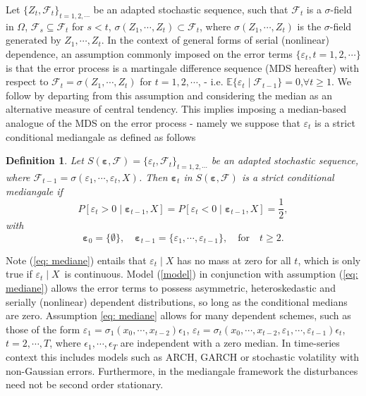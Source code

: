 \documentclass[harvard,11pt]{article}
\newcommand{\E}{\mathbb{E}}
\newtheorem{definition}{Definition}
\begin{document}
 Let $\{Z_t,\mathcal{F}_t\}_{t=1,2,\cdots}$ be an adapted stochastic sequence, such that $\mathcal{F}_t$ is a $\sigma$-field in $\Omega$, $\mathcal{F}_s\subseteq \mathcal{F}_t$ for $s< t$, $\sigma( Z_1,\cdots,Z_t)\subset \mathcal{F}_t$, where $\sigma(Z_1,\cdots,Z_t)$ is the $\sigma$-field generated by $Z_1,\cdots,Z_t$. In the context of general forms of serial (nonlinear) dependence, an assumption commonly imposed on the error terms $\{\varepsilon_t,t=1,2,\cdots\}$ is that the error process is a martingale difference sequence (MDS hereafter) with respect to $\mathcal{F}_t=\sigma(Z_1,\cdots,Z_t)$ for $t=1,2,\cdots$, - i.e. $\E\{\varepsilon_t\mid \mathcal{F}_{t-1}\}=0$,\quad $\forall t\geq1$. We follow \citet{coudin2009finite} by departing from this assumption and considering the median as an alternative measure of central tendency. This implies imposing a median-based analogue of the MDS on the error process - namely we suppose that $\varepsilon_t$ is a strict conditional mediangale as defined as follows
\begin{definition}
Let $S(\bm{\varepsilon},\mathcal{F})=\{\varepsilon_t,\mathcal{F}_{t}\}_{t=1,2,\cdots}$ be an adapted stochastic sequence, where $\mathcal{F}_{t-1}=\sigma(\varepsilon_1,\cdots,\varepsilon_t,X)$. Then $\bm{\varepsilon}_t$ in $S(\bm{\varepsilon},\mathcal{F})$ is a strict conditional mediangale if
\begin{equation}
P[\varepsilon_{t}> 0\mid \bm{{\varepsilon}}_{t-1},X]=P[\varepsilon_{t}<0\mid \bm{\varepsilon}_{t-1},X]=\frac{1}{2},
\label{eq: mediane}
\end{equation}%
with
\[
\bm{\varepsilon}_{0}=\{\emptyset\},\quad\bm{\varepsilon}_{t-1}=\{\varepsilon_1,\cdots,\varepsilon_{t-1}\},\quad\text{for}\quad t\geq2.
\]
\end{definition}
\begin{sloppypar}
 Note (\ref{eq: mediane}) entails that $\varepsilon _{t}\mid X$ has no mass at zero for all $t$, which is only true if $\varepsilon_{t}\mid X$\ is continuous. Model (\ref{model}) in conjunction with assumption (\ref{eq: mediane}) allows the error terms to possess asymmetric, heteroskedastic and serially (nonlinear) dependent distributions, so long as the conditional medians are zero. Assumption \ref{eq: mediane} allows for many dependent schemes, such as those of the form $\varepsilon_1=\sigma_1(x_0,\cdots,x_{t-2})\epsilon_1$, $\varepsilon_t=\sigma_t(x_0,\cdots,x_{t-2},\varepsilon_1,\cdots,\varepsilon_{t-1})\epsilon_t$, $t=2,\cdots,T$, where $\epsilon_1,\cdots,\epsilon_T$ are independent with a zero median. In time-series context this includes models such as ARCH, GARCH or stochastic volatility with non-Gaussian errors. Furthermore, in the mediangale framework the disturbances need not be second order stationary.
\end{sloppypar} 
\end{document}
